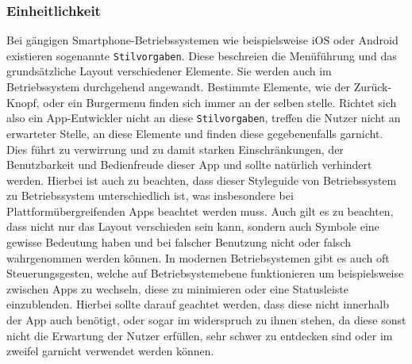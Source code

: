 \documentclass[a4paper, ngerman, 12pt, usenames, dvipsnames]{article}
\begin{document}
\subsubsection{Einheitlichkeit}
Bei gängigen Smartphone-Betriebssystemen wie beispielsweise iOS oder Android existieren sogenannte \texttt{Stilvorgaben}. Diese beschreien die Menüführung und das grundsätzliche Layout verschiedener Elemente. Sie werden auch im Betriebssystem durchgehend angewandt. Bestimmte Elemente, wie der Zurück-Knopf, oder ein Burgermenu finden sich immer an der selben stelle. Richtet sich also ein App-Entwickler nicht an diese \texttt{Stilvorgaben}, treffen die Nutzer nicht an erwarteter Stelle, an diese Elemente und finden diese gegebenenfalls garnicht. Dies führt zu verwirrung und zu damit starken Einschränkungen, der Benutzbarkeit und Bedienfreude dieser App und sollte natürlich verhindert werden. Hierbei ist auch zu beachten, dass dieser Styleguide von Betriebssystem zu Betriebssystem unterschiedlich ist, was insbesondere bei Plattformübergreifenden Apps beachtet werden muss. Auch gilt es zu beachten, dass nicht nur das Layout verschieden sein kann, sondern auch Symbole eine gewisse Bedeutung haben und bei falscher Benutzung nicht oder falsch wahrgenommen werden können. In modernen Betriebsystemen gibt es auch oft Steuerungsgesten, welche auf Betriebsystemebene funktionieren um beispielsweise zwischen Apps zu wechseln, diese zu minimieren oder eine Statusleiste einzublenden. Hierbei sollte darauf geachtet werden, dass diese nicht innerhalb der App auch benötigt, oder sogar im widerspruch zu ihnen stehen, da diese sonst nicht die Erwartung der Nutzer erfüllen, sehr schwer zu entdecken sind oder im zweifel garnicht verwendet werden können.  
\end{document}
